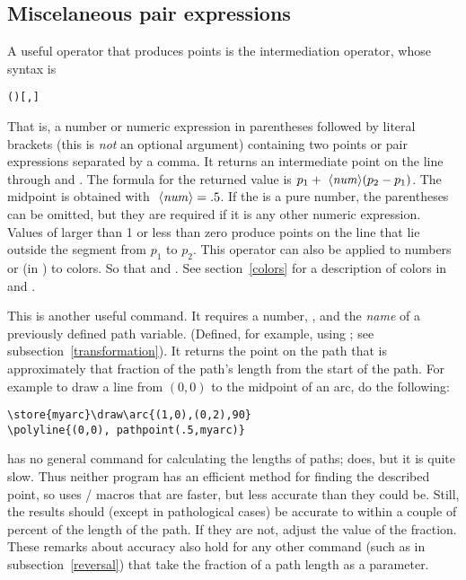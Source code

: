\documentclass[letterpaper]{article}
\begin{document}
\subsection{Miscelaneous pair expressions}\label{pairexpressions}

A useful \MF{} operator that produces points is the intermediation
operator, whose syntax is
\begin{cd}
\texttt{()[,]}
\end{cd}
That is, a number or numeric expression in parentheses followed by
literal brackets (this is \emph{not} an optional argument) containing two points
or pair expressions separated by a comma. It returns an intermediate point on
the line through  and . The formula for the
returned value is $p_1 + \mbox{ \ensuremath{\langle\mbox{\rmfamily\itshape num\/}\rangle}}(p_2 - p_1)$. The midpoint is
obtained with $\mbox{ \ensuremath{\langle\mbox{\rmfamily\itshape num\/}\rangle}} = .5$. If the  is a pure
number, the parentheses can be omitted, but they are required if it is
any other numeric expression. Values of  larger than 1 or
less than zero produce points on the line that lie outside the segment
from $p_1$ to $p_2$. This operator can also be applied to
numbers or (in \MP{}) to colors. So that  and
.  See section~\ref{colors} for a
description of colors in \MP{} and \MF{}.

\begin{cd}
\end{cd}
This is another useful \MF{} command. It requires a number, ,
and the \emph{name} of a previously defined \MF{} path variable.
(Defined, for example, using ; see
subsection~\ref{transformation}). It returns the point on the path that
is approximately that fraction of the path's length from the start of
the path. For example to draw a line from $(0,0)$ to the midpoint of an
arc, do the following:
\begin{verbatim}
\store{myarc}\draw\arc{(1,0),(0,2),90}
\polyline{(0,0), pathpoint(.5,myarc)}
\end{verbatim}
\CMF{} has no general command for calculating the lengths of paths;
\CMP{} does, but it is quite slow. Thus neither program has an efficient
method for finding the described point, so \mfp{} uses \MF\slash\MP{} macros
that are faster, but less accurate than they could be. Still, the
results should (except in pathological cases) be accurate to within a
couple of percent of the length of the path. If they are not, adjust the
value of the fraction. These remarks about accuracy also hold for any
other command (such as  in subsection~\ref{reversal}) that
take the fraction of a path length as a parameter.
\end{document}
